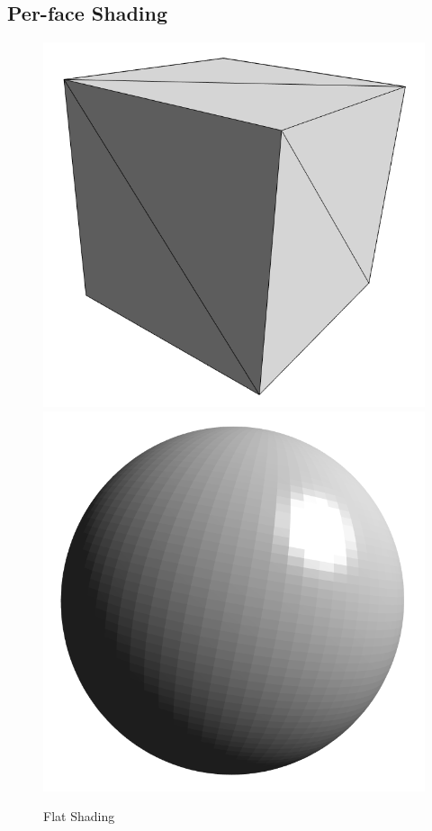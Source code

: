 \documentclass[11pt]{amsart}
\begin{document}
\subsection{Per-face Shading}
\begin{figure}[h!]
   \centering
   \includegraphics[scale=0.18]{cube_face.png} %
\hspace{3cm}
   \includegraphics[scale=0.18]{sphere_face.png} %
   \caption{Flat Shading}
   \label{fig:flat_shading}
\end{figure}
\end{document}
